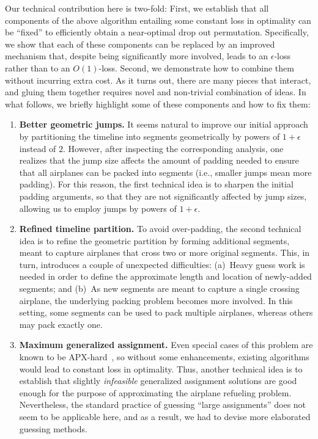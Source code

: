 \documentclass[11pt]{article}
\theoremstyle{plain}
\theoremstyle{definition}
\begin{document}
 Our technical contribution here is two-fold: First, we establish that all components of the above algorithm entailing some constant loss in optimality can be ``fixed'' to efficiently obtain a near-optimal drop out permutation. Specifically, we show that each of these components can be replaced by an improved mechanism that, despite being significantly more involved, leads to an $\epsilon$-loss rather than to an $O(1)$-loss. Second, we demonstrate how to combine them without incurring extra cost. As it turns out, there are many pieces that interact, and gluing them together requires novel and non-trivial combination of ideas. 
In what follows, we briefly highlight some of these components and how to fix them:
\begin{enumerate}
\item {\bf Better geometric jumps.} It seems natural to improve our initial approach by partitioning the timeline into segments geometrically by powers of $1 + \epsilon$ instead of $2$. However, after inspecting the corresponding analysis, one realizes that the jump size affects the amount of padding needed to ensure that all airplanes can be packed into segments (i.e., smaller jumps mean more padding). For this reason, the first technical idea is to sharpen the initial padding arguments, so that they are not significantly affected by jump sizes, allowing us to employ jumps by powers of $1 + \epsilon$.

\item {\bf Refined timeline partition.} To avoid over-padding, the second technical idea is to refine the geometric partition by forming additional segments, meant to capture airplanes that cross two or more original segments. This, in turn, introduces a couple of unexpected difficulties: (a)~Heavy guess work is needed in order to define the approximate length and location of newly-added segments; and (b)~As new segments are meant to capture a single crossing airplane, the underlying packing problem becomes more involved. In this setting, some segments can be used to pack multiple airplanes, whereas others may pack exactly one.

\item {\bf Maximum generalized assignment.} Even special cases of this problem are known to be APX-hard~\cite{ChekuriK05}, so without some enhancements, existing algorithms would lead to constant loss in optimality. Thus, another technical idea is to establish that slightly \textit{infeasible} generalized assignment solutions are good enough for the purpose of approximating the airplane refueling problem. Nevertheless, the standard practice of guessing ``large assignments'' does not seem to be applicable here, and as a result, we had to devise more elaborated guessing methods.


\end{enumerate}
\end{document}

